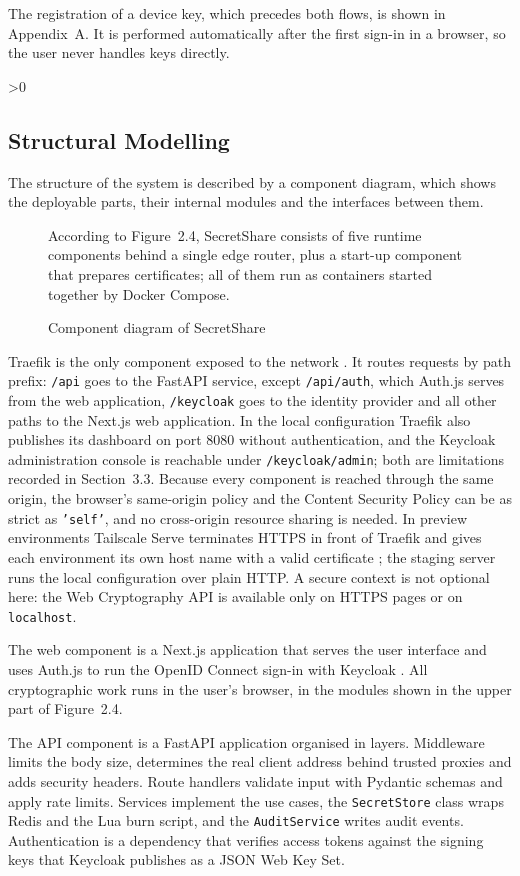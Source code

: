 \documentclass[12pt,a4paper]{article}
\numberwithin{equation}{section}
\numberwithin{figure}{section}
\numberwithin{table}{section}
\newcommand{\subsec}[1]{%
  \ifnum\value{subsection}>0\clearpage\fi
  \subsection{#1}%
}
\newcommand{\leadin}[1]{%
  {\onehalfspacing\setlength{\parindent}{1.25cm}\indent #1\par}\vspace{8pt}}
\newcommand{\diagram}[4]{%
  \begin{figure}[H]
    \leadin{#4}
    \centering
    \adjustbox{max width=\textwidth}{}
    \caption{#2}
    \label{#3}
  \end{figure}}
\begin{document}
The registration of a device key, which precedes both flows, is shown in Appendix~A. It is performed automatically after the first sign-in in a browser, so the user never handles keys directly.

\subsec{Structural Modelling}

The structure of the system is described by a component diagram, which shows the deployable parts, their internal modules and the interfaces between them.

\diagram{component}{Component diagram of SecretShare}{fig:component}{According to Figure~2.4, SecretShare consists of five runtime components behind a single edge router, plus a start-up component that prepares certificates; all of them run as containers started together by Docker Compose.}

Traefik is the only component exposed to the network \cite{traefik}. It routes requests by path prefix: \texttt{/api} goes to the FastAPI service, except \texttt{/api/auth}, which Auth.js serves from the web application, \texttt{/keycloak} goes to the identity provider and all other paths to the Next.js web application. In the local configuration Traefik also publishes its dashboard on port 8080 without authentication, and the Keycloak administration console is reachable under \texttt{/keycloak/admin}; both are limitations recorded in Section~3.3. Because every component is reached through the same origin, the browser's same-origin policy and the Content Security Policy can be as strict as \texttt{'self'}, and no cross-origin resource sharing is needed. In preview environments Tailscale Serve terminates HTTPS in front of Traefik and gives each environment its own host name with a valid certificate \cite{tailscaleserve}; the staging server runs the local configuration over plain HTTP. A secure context is not optional here: the Web Cryptography API is available only on HTTPS pages or on \texttt{localhost}.

The web component is a Next.js application \cite{nextjs} that serves the user interface and uses Auth.js to run the OpenID Connect sign-in with Keycloak \cite{authjs}. All cryptographic work runs in the user's browser, in the modules shown in the upper part of Figure~2.4.

The API component is a FastAPI application \cite{fastapi} organised in layers. Middleware limits the body size, determines the real client address behind trusted proxies and adds security headers. Route handlers validate input with Pydantic schemas and apply rate limits. Services implement the use cases, the \texttt{SecretStore} class wraps Redis and the Lua burn script, and the \texttt{AuditService} writes audit events. Authentication is a dependency that verifies access tokens against the signing keys that Keycloak publishes as a JSON Web Key Set.
\end{document}
